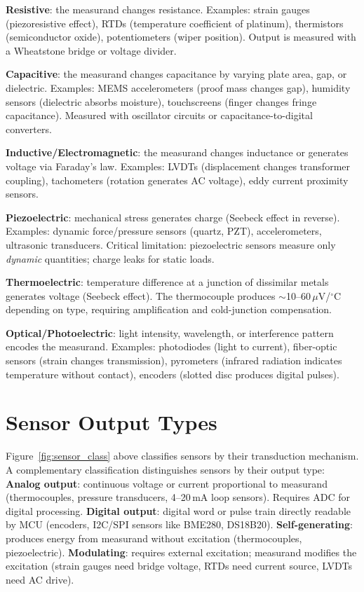 \documentclass[11pt,letterpaper,twoside,openany]{book}
\newcommand{\degC}{\ensuremath{{}^{\circ}\text{C}}}
\begin{document}
\textbf{Resistive}: the measurand changes resistance. Examples: strain gauges (piezoresistive effect), RTDs (temperature coefficient of platinum), thermistors (semiconductor oxide), potentiometers (wiper position). Output is measured with a Wheatstone bridge or voltage divider.

\textbf{Capacitive}: the measurand changes capacitance by varying plate area, gap, or dielectric. Examples: MEMS accelerometers (proof mass changes gap), humidity sensors (dielectric absorbs moisture), touchscreens (finger changes fringe capacitance). Measured with oscillator circuits or capacitance-to-digital converters.

\textbf{Inductive/Electromagnetic}: the measurand changes inductance or generates voltage via Faraday's law. Examples: LVDTs (displacement changes transformer coupling), tachometers (rotation generates AC voltage), eddy current proximity sensors.

\textbf{Piezoelectric}: mechanical stress generates charge (Seebeck effect in reverse). Examples: dynamic force/pressure sensors (quartz, PZT), accelerometers, ultrasonic transducers. Critical limitation: piezoelectric sensors measure only \emph{dynamic} quantities; charge leaks for static loads.

\textbf{Thermoelectric}: temperature difference at a junction of dissimilar metals generates voltage (Seebeck effect). The thermocouple produces $\sim$10--60\,$\mu$V/\degC{} depending on type, requiring amplification and cold-junction compensation.

\textbf{Optical/Photoelectric}: light intensity, wavelength, or interference pattern encodes the measurand. Examples: photodiodes (light to current), fiber-optic sensors (strain changes transmission), pyrometers (infrared radiation indicates temperature without contact), encoders (slotted disc produces digital pulses).

\section{Sensor Output Types}
Figure~\ref{fig:sensor_class} above classifies sensors by their transduction mechanism. A complementary classification distinguishes sensors by their output type:
\textbf{Analog output}: continuous voltage or current proportional to measurand (thermocouples, pressure transducers, 4--20\,mA loop sensors). Requires ADC for digital processing. \textbf{Digital output}: digital word or pulse train directly readable by MCU (encoders, I2C/SPI sensors like BME280, DS18B20). \textbf{Self-generating}: produces energy from measurand without excitation (thermocouples, piezoelectric). \textbf{Modulating}: requires external excitation; measurand modifies the excitation (strain gauges need bridge voltage, RTDs need current source, LVDTs need AC drive).
\end{document}
